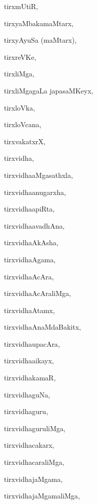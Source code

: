 \begin{multicols}{2}
{tirxmUtiR}, \pageref{tirxmUtiR}

{tirxyaMbakamaMtarx}, \pageref{tirxyaMbakamaMtarx}

{tirxyAyuSa (maMtarx)}, \pageref{tirxyAyuSa maMtarx}

{tirxreVKe}, \pageref{tirxreVKe}

{tirxliMga}, \pageref{tirxliMga}

{tirxliMgagaLa japasaMKeyx}, \pageref{tirxliMgagaLa japasaMKeyx}

{tirxloVka}, \pageref{tirxloVka}

{tirxloVcana}, \pageref{tirxloVcana}

{tirxvakatxrX}, \pageref{tirxvakatxrX}

{tirxvidha}, \pageref{tirxvidha}

{tirxvi{dha}aMgasathxla}, \pageref{tirxvidhaaMgasathxla}

{tirxvi{dha}anugarxha}, \pageref{tirxvidhaanugarxha}

{tirxvi{dha}apiRta}, \pageref{tirxvidhaapiRta}

{tirxvi{dha}avadhAna}, \pageref{tirxvidhaavadhAna}

{tirxvi{dha}AkAsha}, \pageref{tirxvidhaAkAsha}

{tirxvi{dha}Agama}, \pageref{tirxvidhaAgama}

{tirxvi{dha}AcAra}, \pageref{tirxvidhaAcAra}

{tirxvi{dha}AcAraliMga}, \pageref{tirxvidhaAcAraliMga}

{tirxvi{dha}Atamx}, \pageref{tirxvidhaAtamx}

{tirxvi{dha}AnaMdaBakitx}, \pageref{tirxvidhaAnaMdaBakitx}

{tirxvi{dha}upacAra}, \pageref{tirxvidhaupacAra}

{tirxvi{dha}aikayx}, \pageref{tirxvidhaaikayx}

{tirxvidhakamaR}, \pageref{tirxvidhakamaR}

{tirxvidhaguNa}, \pageref{tirxvidhaguNa}

{tirxvidhaguru}, \pageref{tirxvidhaguru}

{tirxvidhaguruliMga}, \pageref{tirxvidhaguruliMga}

{tirxvidhacakarx}, \pageref{tirxvidhacakarx}

{tirxvidhacaraliMga}, \pageref{tirxvidhacaraliMga}

{tirxvidhajaMgama}, \pageref{tirxvidhajaMgama}

{tirxvidhajaMgamaliMga}, \pageref{tirxvidhajaMgamaliMga}


\end{multicols}
